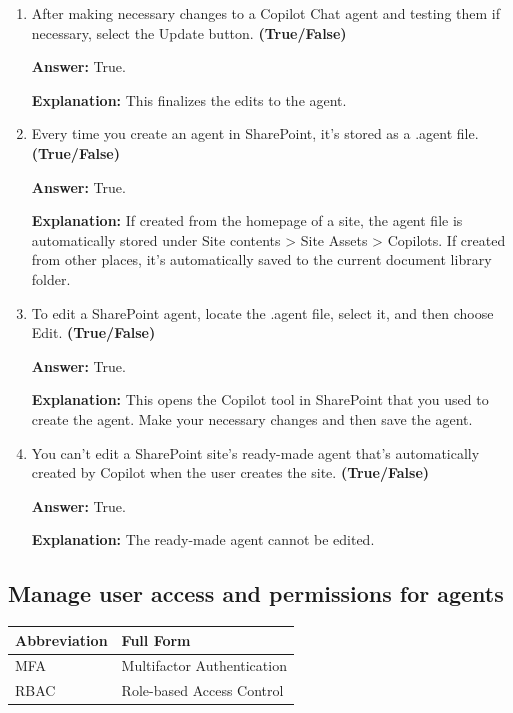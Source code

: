 \documentclass[10pt]{article}
\begin{document}
\begin{enumerate}[leftmargin=*]
\item After making necessary changes to a Copilot Chat agent and testing them if necessary, select the Update button. \textbf{(True/False)}

\textbf{Answer:} True.

\textbf{Explanation:} This finalizes the edits to the agent.

\item Every time you create an agent in SharePoint, it's stored as a .agent file. \textbf{(True/False)}

\textbf{Answer:} True.

\textbf{Explanation:} If created from the homepage of a site, the agent file is automatically stored under Site contents > Site Assets > Copilots. If created from other places, it's automatically saved to the current document library folder.

\item To edit a SharePoint agent, locate the .agent file, select it, and then choose Edit. \textbf{(True/False)}

\textbf{Answer:} True.

\textbf{Explanation:} This opens the Copilot tool in SharePoint that you used to create the agent. Make your necessary changes and then save the agent.

\item You can't edit a SharePoint site's ready-made agent that's automatically created by Copilot when the user creates the site. \textbf{(True/False)}

\textbf{Answer:} True.

\textbf{Explanation:} The ready-made agent cannot be edited.

\end{enumerate}

\clearpage
\subsection{Manage user access and permissions for agents}

\begin{center}
\begin{tabular}{>{\raggedright\arraybackslash}p{} >{\raggedright\arraybackslash}p{}}
\toprule
\textbf{Abbreviation} & \textbf{Full Form} \\
\midrule
MFA & Multifactor Authentication \\
RBAC & Role-based Access Control \\
\bottomrule
\end{tabular}
\end{center}
\end{document}
